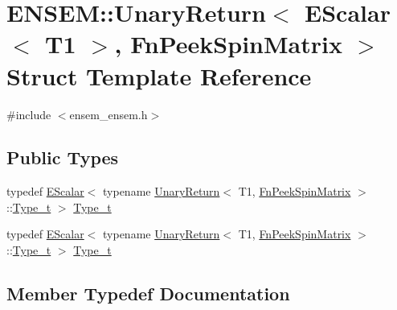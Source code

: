 \hypertarget{structENSEM_1_1UnaryReturn_3_01EScalar_3_01T1_01_4_00_01FnPeekSpinMatrix_01_4}{}\section{E\+N\+S\+EM\+:\+:Unary\+Return$<$ E\+Scalar$<$ T1 $>$, Fn\+Peek\+Spin\+Matrix $>$ Struct Template Reference}
\label{structENSEM_1_1UnaryReturn_3_01EScalar_3_01T1_01_4_00_01FnPeekSpinMatrix_01_4}


{\ttfamily \#include $<$ensem\+\_\+ensem.\+h$>$}

\subsection*{Public Types}
\begin{DoxyCompactItemize}
\item 
typedef \mbox{\hyperlink{classENSEM_1_1EScalar}{E\+Scalar}}$<$ typename \mbox{\hyperlink{structENSEM_1_1UnaryReturn}{Unary\+Return}}$<$ T1, \mbox{\hyperlink{structENSEM_1_1FnPeekSpinMatrix}{Fn\+Peek\+Spin\+Matrix}} $>$\+::\mbox{\hyperlink{structENSEM_1_1UnaryReturn_3_01EScalar_3_01T1_01_4_00_01FnPeekSpinMatrix_01_4_a957ed63ce5bc6fafff58fcb1c1122635}{Type\+\_\+t}} $>$ \mbox{\hyperlink{structENSEM_1_1UnaryReturn_3_01EScalar_3_01T1_01_4_00_01FnPeekSpinMatrix_01_4_a957ed63ce5bc6fafff58fcb1c1122635}{Type\+\_\+t}}
\item 
typedef \mbox{\hyperlink{classENSEM_1_1EScalar}{E\+Scalar}}$<$ typename \mbox{\hyperlink{structENSEM_1_1UnaryReturn}{Unary\+Return}}$<$ T1, \mbox{\hyperlink{structENSEM_1_1FnPeekSpinMatrix}{Fn\+Peek\+Spin\+Matrix}} $>$\+::\mbox{\hyperlink{structENSEM_1_1UnaryReturn_3_01EScalar_3_01T1_01_4_00_01FnPeekSpinMatrix_01_4_a957ed63ce5bc6fafff58fcb1c1122635}{Type\+\_\+t}} $>$ \mbox{\hyperlink{structENSEM_1_1UnaryReturn_3_01EScalar_3_01T1_01_4_00_01FnPeekSpinMatrix_01_4_a957ed63ce5bc6fafff58fcb1c1122635}{Type\+\_\+t}}
\end{DoxyCompactItemize}


\subsection{Member Typedef Documentation}
\mbox{\label{structENSEM_1_1UnaryReturn_3_01EScalar_3_01T1_01_4_00_01FnPeekSpinMatrix_01_4_a957ed63ce5bc6fafff58fcb1c1122635}} 
